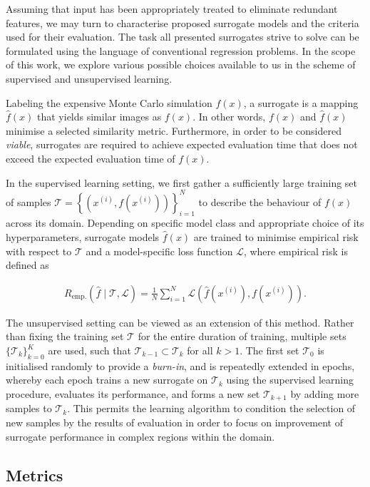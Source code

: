 Assuming that input has been appropriately treated to eliminate redundant
features, we may turn to characterise proposed surrogate models and the criteria
used for their evaluation. The task all presented surrogates strive to solve can be
formulated using the language of conventional regression problems. In the scope
of this work, we explore various possible choices available to us in the
scheme of supervised and unsupervised learning.

Labeling the expensive Monte Carlo simulation $f(x)$, a surrogate is a mapping
$\hat{f}(x)$ that yields similar images as $f(x)$. In other words, $f(x)$ and
$\hat{f}(x)$ minimise a selected similarity metric. Furthermore, in order to
be considered \textit{viable}, surrogates are required to achieve expected evaluation time
that does not exceed the expected evaluation time of $f(x)$.

In the supervised learning setting, we first gather a sufficiently large
training set of samples $\mathcal{T}=\left\{\left( x^{(i)},f\left(x^{(i)}\right) \right)\right\}_{i=1}^N$
to describe the behaviour of $f(x)$ across its domain.
Depending on specific model class and appropriate choice of its
hyperparameters, surrogate models $\hat{f}(x)$ are trained to minimise
empirical risk with respect to $\mathcal{T}$ and a model-specific
loss function $\mathcal{L}$, where empirical risk is defined as

\begin{align}
	R_{\text{emp.}}(\hat{f}\mid\mathcal{T},\mathcal{L})
	=\frac{1}{N}\sum_{i=1}^N
	\mathcal{L}\left(\hat{f}(x^{(i)}),f(x^{(i)})\right).
\end{align}

The unsupervised setting can be viewed as an extension of this method.
Rather than fixing the training set $\mathcal{T}$ for the entire duration of
training, multiple sets $\{\mathcal{T}_k\}_{k=0}^K$ are used, such that
$\mathcal{T}_{k-1}\subset\mathcal{T}_k$ for all $k>1$. The first set
$\mathcal{T}_0$ is initialised randomly to provide a \textit{burn-in}, and is
repeatedly extended in epochs, whereby each epoch trains a new surrogate on
$\mathcal{T}_k$ using the supervised learning procedure, evaluates its
performance, and forms a new set $\mathcal{T}_{k+1}$ by adding more samples to
$\mathcal{T}_k$. This permits the learning algorithm to condition the selection
of new samples by the results of evaluation in order to focus on improvement of
surrogate performance in complex regions within the domain.


\subsection{Metrics}
\label{sec:metrics}

